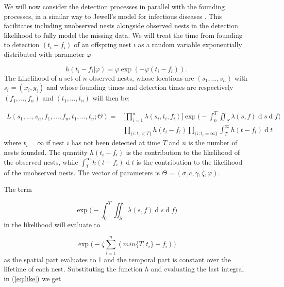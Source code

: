 \documentclass{article}
\renewcommand{\d}[1]{\ensuremath{\operatorname{d}\!{#1}}}
\begin{document}
We will now consider the detection processes in parallel with the founding processes, in a similar way to Jewell's model for infectious diseases \cite{Jewell}. This facilitates including unobserved nests alongside observed nests in the detection likelihood to fully model the missing data. We will treat the time from founding to detection $(t_i - f_i)$ of an offspring nest $i$ as a random variable exponentially distributed with parameter $\varphi$

\begin{equation*}
    h(t_{i} - f_{i} | \varphi) = \varphi \exp (- \varphi(t_{i} - f_{i})).
\end{equation*}
The Likelihood of a set of $n$ observed nests, whose locations are $(s_{1}, ... , s_{n})$ with $s_i = (x_i, y_i)$ and whose founding times and detection times are respectively $(f_{1}, ... , f_{n})$ and $(t_{1},  ... , t_{n})$ will then be:

\begin{equation} \label{eq:like}
    \begin{aligned}
        L(s_{1}, ..., s_{n}, f_{1}, ..., f_{n}, t_{1}, ..., t_{n} ; \Theta) = & \Bigg[ \prod_{i = 1}^{n} \lambda(s_{i}, t_{i}, f_{i}) \Bigg] \exp \Bigg(- \int_{0}^{T} \iint_{S} \lambda(s, f) \d s \d f \Bigg) \\ 
        & \prod_{\{ i : t_{i} < T \} } h(t_{i} - f_{i}) \prod_{ \{ i : t_{i} = \infty \} } \int_{T}^{\infty} h(t - f_{i}) \d t
    \end{aligned}
\end{equation}
where $t_{i} = \infty$ if nest $i$ has not been detected at time $T$ and $n$ is the number of nests founded. The quantity $h(t_{i} - f_{i})$ is the contribution to the likelihood of the observed nests, while $\int_{T}^{\infty} h(t - f_{i}) \d t$ is the contribution to the likelihood of the unobserved nests. The vector of parameters is $\Theta = ( \sigma, c, \gamma, \zeta, \varphi)$.

The term 

\begin{equation*}
    \exp \bigg(- \int_{0}^{T} \iint_{S} \lambda(s, f)\d s \d f \bigg)
\end{equation*}
in the likelihood will evaluate to 

\begin{equation*}
    \exp \bigg(- \zeta \sum_{i=1}^{n} (min\{ T, t_i \} - f_i) \bigg)
\end{equation*}
as the spatial part evaluates to 1 and the temporal part is constant over the lifetime of each nest. Substituting the function $h$ and evaluating the last integral in (\ref{eq:like}) we get
\end{document}
